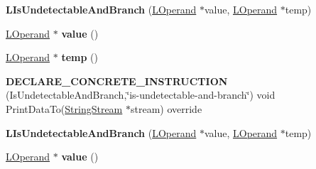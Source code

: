 \begin{DoxyCompactItemize}
\item 
{\bfseries L\+Is\+Undetectable\+And\+Branch} (\hyperlink{classv8_1_1internal_1_1_l_operand}{L\+Operand} $\ast$value, \hyperlink{classv8_1_1internal_1_1_l_operand}{L\+Operand} $\ast$temp)\hypertarget{classv8_1_1internal_1_1_l_is_undetectable_and_branch_a48333769d21d80135872b3e667e8c882}{}\label{classv8_1_1internal_1_1_l_is_undetectable_and_branch_a48333769d21d80135872b3e667e8c882}

\item 
\hyperlink{classv8_1_1internal_1_1_l_operand}{L\+Operand} $\ast$ {\bfseries value} ()\hypertarget{classv8_1_1internal_1_1_l_is_undetectable_and_branch_aea79e90e070e85f96e2dca54b3b26773}{}\label{classv8_1_1internal_1_1_l_is_undetectable_and_branch_aea79e90e070e85f96e2dca54b3b26773}

\item 
\hyperlink{classv8_1_1internal_1_1_l_operand}{L\+Operand} $\ast$ {\bfseries temp} ()\hypertarget{classv8_1_1internal_1_1_l_is_undetectable_and_branch_abc3e4f5ebade89f5f49c3e6e416e9c1d}{}\label{classv8_1_1internal_1_1_l_is_undetectable_and_branch_abc3e4f5ebade89f5f49c3e6e416e9c1d}

\item 
{\bfseries D\+E\+C\+L\+A\+R\+E\+\_\+\+C\+O\+N\+C\+R\+E\+T\+E\+\_\+\+I\+N\+S\+T\+R\+U\+C\+T\+I\+ON} (Is\+Undetectable\+And\+Branch,\char`\"{}is-\/undetectable-\/and-\/branch\char`\"{}) void Print\+Data\+To(\hyperlink{classv8_1_1internal_1_1_string_stream}{String\+Stream} $\ast$stream) override\hypertarget{classv8_1_1internal_1_1_l_is_undetectable_and_branch_a28ae934f22deb295f07eed93dfd358ba}{}\label{classv8_1_1internal_1_1_l_is_undetectable_and_branch_a28ae934f22deb295f07eed93dfd358ba}

\item 
{\bfseries L\+Is\+Undetectable\+And\+Branch} (\hyperlink{classv8_1_1internal_1_1_l_operand}{L\+Operand} $\ast$value, \hyperlink{classv8_1_1internal_1_1_l_operand}{L\+Operand} $\ast$temp)\hypertarget{classv8_1_1internal_1_1_l_is_undetectable_and_branch_a48333769d21d80135872b3e667e8c882}{}\label{classv8_1_1internal_1_1_l_is_undetectable_and_branch_a48333769d21d80135872b3e667e8c882}

\item 
\hyperlink{classv8_1_1internal_1_1_l_operand}{L\+Operand} $\ast$ {\bfseries value} ()\hypertarget{classv8_1_1internal_1_1_l_is_undetectable_and_branch_aea79e90e070e85f96e2dca54b3b26773}{}\label{classv8_1_1internal_1_1_l_is_undetectable_and_branch_aea79e90e070e85f96e2dca54b3b26773}


\end{DoxyCompactItemize}
